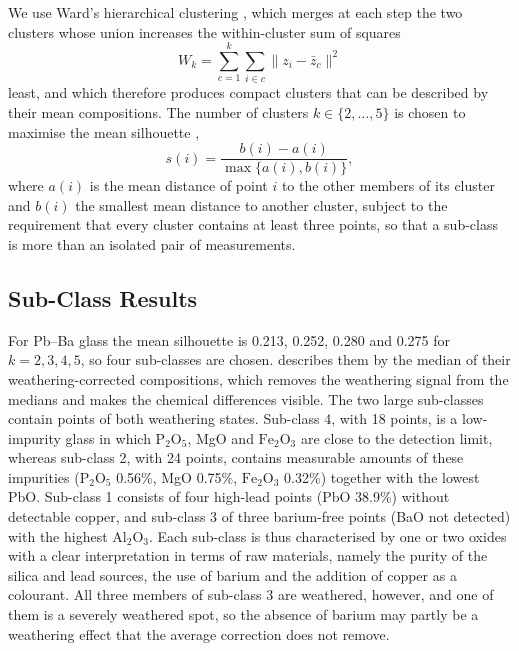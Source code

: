 \documentclass[11pt,a4paper]{article}
\newcommand{\ox}[1]{\ensuremath{\mathrm{#1}}}
\begin{document}
We use Ward's hierarchical clustering \citep{ward1963}, which merges at each step the two clusters whose union increases the within-cluster sum of squares
\begin{equation}
W_k=\sum_{c=1}^{k}\sum_{i\in c}\lVert z_i-\bar z_c\rVert^2
\end{equation}
least, and which therefore produces compact clusters that can be described by their mean compositions.
The number of clusters $k\in\{2,\dots,5\}$ is chosen to maximise the mean silhouette \citep{rousseeuw1987},
\begin{equation}
s(i)=\frac{b(i)-a(i)}{\max\{a(i),b(i)\}},
\end{equation}
where $a(i)$ is the mean distance of point $i$ to the other members of its cluster and $b(i)$ the smallest mean distance to another cluster, subject to the requirement that every cluster contains at least three points, so that a sub-class is more than an isolated pair of measurements.

\subsection{Sub-Class Results}
For Pb--Ba glass the mean silhouette is 0.213, 0.252, 0.280 and 0.275 for $k=2,3,4,5$, so four sub-classes are chosen.
 describes them by the median of their weathering-corrected compositions, which removes the weathering signal from the medians and makes the chemical differences visible.
The two large sub-classes contain points of both weathering states.
Sub-class 4, with 18 points, is a low-impurity glass in which \ox{P_2O_5}, MgO and \ox{Fe_2O_3} are close to the detection limit, whereas sub-class 2, with 24 points, contains measurable amounts of these impurities (\ox{P_2O_5} 0.56\%, MgO 0.75\%, \ox{Fe_2O_3} 0.32\%) together with the lowest PbO.
Sub-class 1 consists of four high-lead points (PbO 38.9\%) without detectable copper, and sub-class 3 of three barium-free points (BaO not detected) with the highest \ox{Al_2O_3}.
Each sub-class is thus characterised by one or two oxides with a clear interpretation in terms of raw materials, namely the purity of the silica and lead sources, the use of barium and the addition of copper as a colourant.
All three members of sub-class 3 are weathered, however, and one of them is a severely weathered spot, so the absence of barium may partly be a weathering effect that the average correction does not remove.
\end{document}
